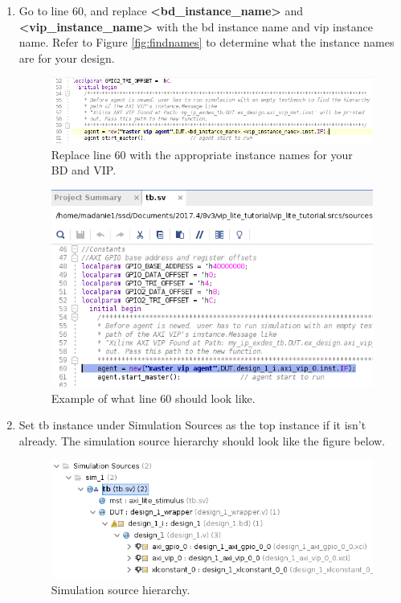 \documentclass[12pt]{article}
\begin{document}
\begin{enumerate}
	\item Go to line 60, and replace \textbf{\textless bd\_instance\_name\textgreater} and \textbf{\textless vip\_instance\_name\textgreater} with the bd instance name and vip instance name. Refer to Figure \ref{fig:findnames} to determine what the instance names are for your design.
		\begin{figure}[H]
		  \centering
		  \includegraphics[scale=0.5]{instancename1.png}
		  \caption{Replace line 60 with the appropriate instance names for your BD and VIP.}
		  \label{fig:instancename1}
		\end{figure}
				\begin{figure}[H]
		  \centering
		  \includegraphics[scale=0.5]{instancename2.png}
		  \caption{Example of what line 60 should look like.}
		  \label{fig:instancename2}
		\end{figure}
	\item Set tb instance under Simulation Sources as the top instance if it isn't already. The simulation source hierarchy should look like the figure below. 
		\begin{figure}[H]
		  \centering
		  \includegraphics[scale=0.5]{filehierarchy.png}
		  \caption{Simulation source hierarchy.}
		  \label{fig:filehierarchy}
		\end{figure} 
\end{enumerate}
\end{document}
